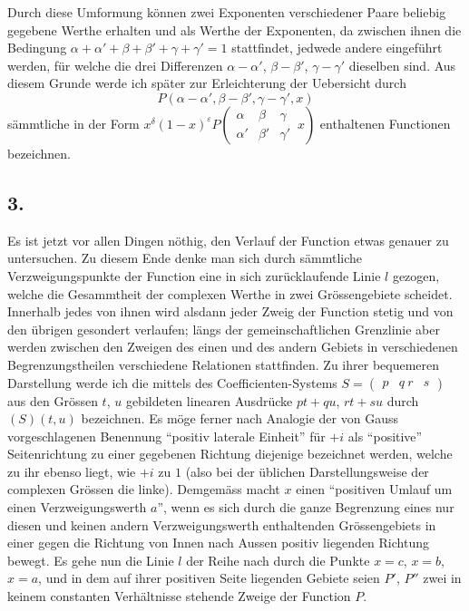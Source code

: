 \documentclass[12pt,a4paper]{article}
\begin{document}
Durch diese Umformung können zwei Exponenten verschiedener Paare beliebig gegebene Werthe erhalten und als Werthe der Exponenten, da zwischen ihnen die Bedingung $\alpha + \alpha' + \beta + \beta' + \gamma + \gamma' = 1$ stattfindet, jedwede andere eingeführt werden, für welche die drei Differenzen $\alpha - \alpha'$, $\beta - \beta'$, $\gamma - \gamma'$ dieselben sind. Aus diesem Grunde werde ich später zur Erleichterung der Uebersicht durch
\[
P(\alpha - \alpha', \beta - \beta', \gamma - \gamma', x)
\]
sämmtliche in der Form $x^{\delta} (1-x)^{\varepsilon} P\left(\begin{array}{ccc|} \alpha & \beta & \gamma \\ \alpha' & \beta' & \gamma' \end{array}\, x\right)$ enthaltenen Functionen bezeichnen.

\subsection*{3.}

Es ist jetzt vor allen Dingen nöthig, den Verlauf der Function etwas genauer zu untersuchen. Zu diesem Ende denke man sich durch sämmtliche Verzweigungspunkte der Function eine in sich zurücklaufende Linie $l$ gezogen, welche die Gesammtheit der complexen Werthe in zwei Grössengebiete scheidet. Innerhalb jedes von ihnen wird alsdann jeder Zweig der Function stetig und von den übrigen gesondert verlaufen; längs der gemeinschaftlichen Grenzlinie aber werden zwischen den Zweigen des einen und des andern Gebiets in verschiedenen Begrenzungstheilen verschiedene Relationen stattfinden. Zu ihrer bequemeren Darstellung werde ich die mittels des Coefficienten-Systems $S = \begin{pmatrix} p & q \ r & s \end{pmatrix}$ aus den Grössen $t$, $u$ gebildeten linearen Ausdrücke $pt + qu$, $rt + su$ durch $(S)(t, u)$ bezeichnen. Es möge ferner nach Analogie der von Gauss vorgeschlagenen Benennung ``positiv laterale Einheit'' für $+i$ als ``positive'' Seitenrichtung zu einer gegebenen Richtung diejenige bezeichnet werden, welche zu ihr ebenso liegt, wie $+i$ zu $1$ (also bei der üblichen Darstellungsweise der complexen Grössen die linke). Demgemäss macht $x$ einen ``positiven Umlauf um einen Verzweigungswerth $a$'', wenn es sich durch die ganze Begrenzung eines nur diesen und keinen andern Verzweigungswerth enthaltenden Grössengebiets in einer gegen die Richtung von Innen nach Aussen positiv liegenden Richtung bewegt. Es gehe nun die Linie $l$ der Reihe nach durch die Punkte $x = c$, $x = b$, $x = a$, und in dem auf ihrer positiven Seite liegenden Gebiete seien $P'$, $P''$ zwei in keinem constanten Verhältnisse stehende Zweige der Function $P$.
\end{document}
